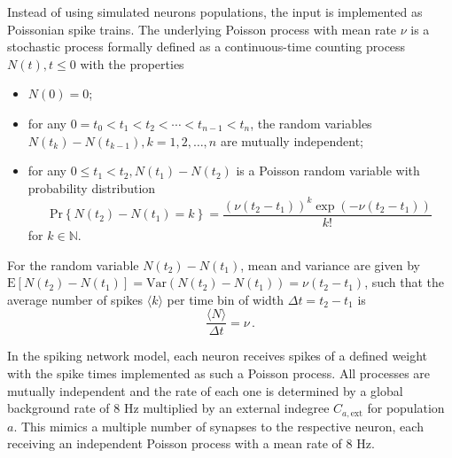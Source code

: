 Instead of using simulated neurons populations, the input is implemented as Poissonian 
spike trains. The underlying Poisson process with mean rate $\nu$ is a stochastic process formally 
defined as a continuous-time counting process ${N(t), t \le 0}$ with the properties%
~\cite{tuckwell2005introduction}
\begin{itemize}
    \item $N(0) = 0$;
    \item for any $0 = t_0 < t_1 < t_2 < \cdots < t_{n-1} < t_n$, the random variables
        $N(t_k) - N(t_{k-1}), k = 1, 2, \dots, n$ are mutually independent; 
    \item for any $0 \le t_1 < t_2, N(t_1) - N(t_2)$ is a Poisson random variable with 
        probability distribution 
        \begin{equation}
            \text{Pr}\left\{N(t_2) - N(t_1) = k \right\} 
                = \frac{\left( \nu(t_2 - t_1) \right)^k \exp \left( - \nu(t_2 - t_1) \right) }{k!}
            \label{eq:poisson_process}
        \end{equation}
        for $k \in \mathbb{N}$.
\end{itemize}
For the random variable $N(t_2) - N(t_1)$, mean and variance are given by
$\text{E}[N(t_2) - N(t_1)] = \text{Var}(N(t_2) - N(t_1)) = \nu(t_2 - t_1)$,
such that the average number of spikes $\langle k \rangle$ 
per time bin of width $\Delta t = t_2 - t_1$ is 
\begin{equation}
    \frac{\langle{N}\rangle}{\Delta t} = \nu \,.
    \label{eq:poisson_rate}
\end{equation}

In the spiking network model, each neuron receives spikes of a defined weight with 
the spike times implemented as such a Poisson process. All processes are mutually independent 
and the rate of each one is determined by a global 
background rate of $8$ Hz multiplied by an external indegree $C_{a, \text{ext}}$ for
population $a$. 
This mimics a multiple number of synapses to the respective neuron, each receiving an 
independent Poisson process with a mean rate of $8$ Hz. 

